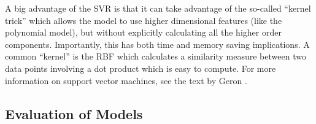 A big advantage of the \gls{SVR} is that it can take advantage of the so-called ``kernel trick'' which allows the model to use higher dimensional features (like the polynomial model), but without explicitly calculating all the higher order components. Importantly, this has both time and memory saving implications. A common ``kernel'' is the \gls{RBF} which calculates a similarity measure between two data points involving a dot product which is easy to compute. For more information on support vector machines, see the text by Geron \cite{Geron_2023_ML}. 



\subsection{Evaluation of Models}

